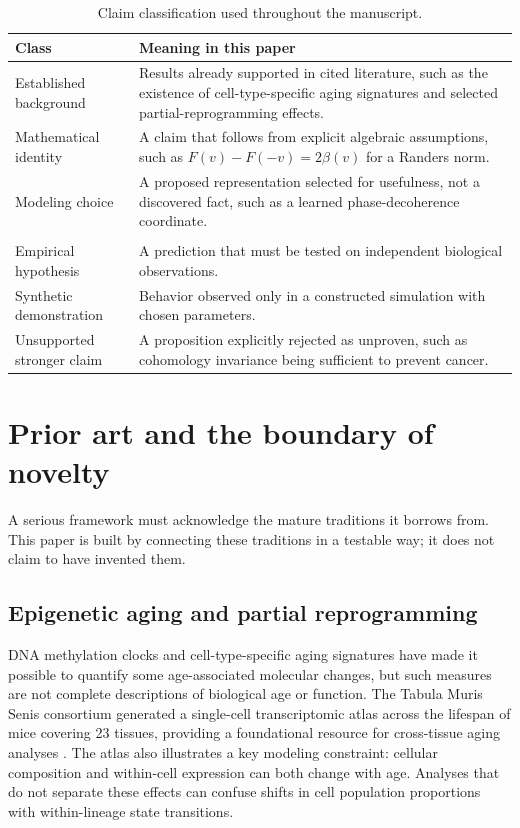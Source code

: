 \documentclass[11pt,a4paper]{article}
\theoremstyle{definition}
\theoremstyle{remark}
\begin{document}
\begin{table}[htbp]
\centering
\caption{Claim classification used throughout the manuscript.}
\begin{tabularx}{\textwidth}{>{\raggedright\arraybackslash}p{} X}
\toprule
Class & Meaning in this paper \\
\midrule
Established background & Results already supported in cited literature, such as the existence of cell-type-specific aging signatures and selected partial-reprogramming effects. \\
Mathematical identity & A claim that follows from explicit algebraic assumptions, such as $F(v)-F(-v)=2\beta(v)$ for a Randers norm. \\
Modeling choice & A proposed representation selected for usefulness, not a discovered fact, such as a learned phase-decoherence coordinate. \\
\\
Empirical hypothesis & A prediction that must be tested on independent biological observations. \\
Synthetic demonstration & Behavior observed only in a constructed simulation with chosen parameters. \\
Unsupported stronger claim & A proposition explicitly rejected as unproven, such as cohomology invariance being sufficient to prevent cancer. \\
\bottomrule
\end{tabularx}
\end{table}

\section{Prior art and the boundary of novelty}
A serious framework must acknowledge the mature traditions it borrows from. This paper is built by connecting these traditions in a testable way; it does not claim to have invented them.

\subsection{Epigenetic aging and partial reprogramming}
DNA methylation clocks and cell-type-specific aging signatures have made it possible to quantify some age-associated molecular changes, but such measures are not complete descriptions of biological age or function. The Tabula Muris Senis consortium generated a single-cell transcriptomic atlas across the lifespan of mice covering 23 tissues, providing a foundational resource for cross-tissue aging analyses \cite{TabulaMuris2020}. The atlas also illustrates a key modeling constraint: cellular composition and within-cell expression can both change with age. Analyses that do not separate these effects can confuse shifts in cell population proportions with within-lineage state transitions.
\end{document}
